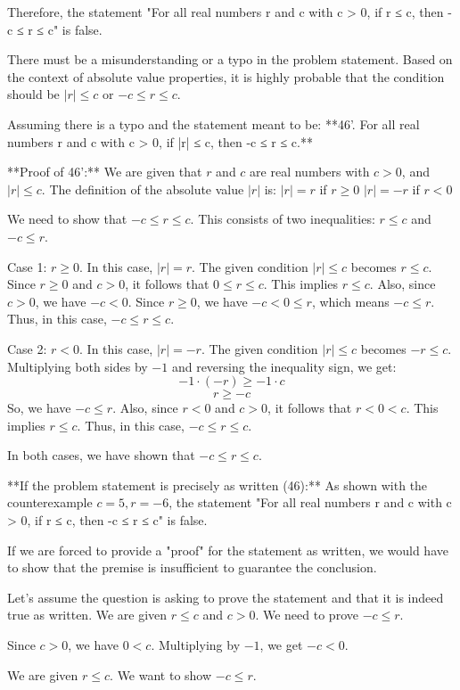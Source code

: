 \documentclass{article}
\begin{document}
Therefore, the statement "For all real numbers r and c with c > 0, if r ≤ c, then -c ≤ r ≤ c" is false.

There must be a misunderstanding or a typo in the problem statement. Based on the context of absolute value properties, it is highly probable that the condition should be $|r| \le c$ or $-c \le r \le c$.

Assuming there is a typo and the statement meant to be:
**46'. For all real numbers r and c with c > 0, if |r| ≤ c, then -c ≤ r ≤ c.**

**Proof of 46':**
We are given that $r$ and $c$ are real numbers with $c > 0$, and $|r| \le c$.
The definition of the absolute value $|r|$ is:
$|r| = r$ if $r \ge 0$
$|r| = -r$ if $r < 0$

We need to show that $-c \le r \le c$. This consists of two inequalities: $r \le c$ and $-c \le r$.

Case 1: $r \ge 0$.
In this case, $|r| = r$.
The given condition $|r| \le c$ becomes $r \le c$.
Since $r \ge 0$ and $c > 0$, it follows that $0 \le r \le c$.
This implies $r \le c$.
Also, since $c > 0$, we have $-c < 0$.
Since $r \ge 0$, we have $-c < 0 \le r$, which means $-c \le r$.
Thus, in this case, $-c \le r \le c$.

Case 2: $r < 0$.
In this case, $|r| = -r$.
The given condition $|r| \le c$ becomes $-r \le c$.
Multiplying both sides by $-1$ and reversing the inequality sign, we get:
$$ -1 \cdot (-r) \ge -1 \cdot c $$
$$ r \ge -c $$
So, we have $-c \le r$.
Also, since $r < 0$ and $c > 0$, it follows that $r < 0 < c$.
This implies $r \le c$.
Thus, in this case, $-c \le r \le c$.

In both cases, we have shown that $-c \le r \le c$.

**If the problem statement is precisely as written (46):**
As shown with the counterexample $c=5, r=-6$, the statement "For all real numbers r and c with c > 0, if r ≤ c, then -c ≤ r ≤ c" is false.

If we are forced to provide a "proof" for the statement as written, we would have to show that the premise is insufficient to guarantee the conclusion.

Let's assume the question is asking to prove the statement and that it is indeed true as written.
We are given $r \le c$ and $c > 0$. We need to prove $-c \le r$.

Since $c > 0$, we have $0 < c$.
Multiplying by $-1$, we get $-c < 0$.

We are given $r \le c$.
We want to show $-c \le r$.
\end{document}
